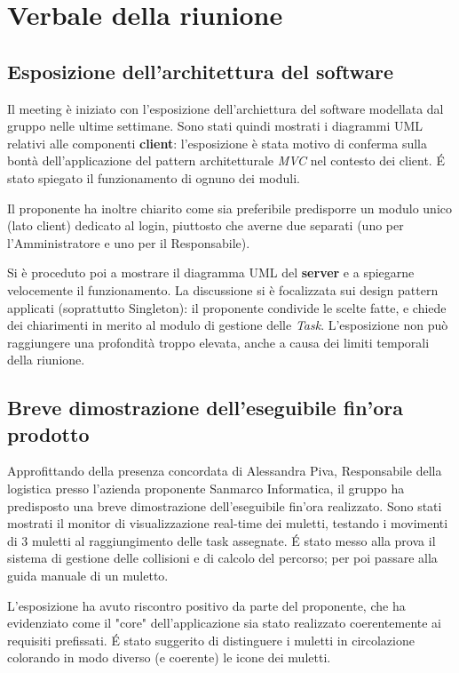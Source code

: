 \section{Verbale della riunione}

\subsection{Esposizione dell'architettura del software}

Il meeting è iniziato con l'esposizione dell'archiettura del software modellata dal gruppo nelle ultime settimane. Sono stati quindi mostrati i diagrammi UML relativi alle componenti \textbf{client}: l'esposizione è stata motivo di conferma sulla bontà dell'applicazione del pattern architetturale \textit{MVC} nel contesto dei client. \'E stato spiegato il funzionamento di ognuno dei moduli. 

Il proponente ha inoltre chiarito come sia preferibile predisporre un modulo unico (lato client) dedicato al login, piuttosto che averne due separati (uno per l'Amministratore e uno per il Responsabile).

Si è proceduto poi a mostrare il diagramma UML del \textbf{server} e a spiegarne velocemente il funzionamento. La discussione si è focalizzata sui design pattern applicati (soprattutto Singleton): il proponente condivide le scelte fatte, e chiede dei chiarimenti in merito al modulo di gestione delle \textit{Task}. L'esposizione non può raggiungere una profondità troppo elevata, anche a causa dei limiti temporali della riunione.

\subsection{Breve dimostrazione dell'eseguibile fin'ora prodotto}

Approfittando della presenza concordata di Alessandra Piva, Responsabile della logistica presso l'azienda proponente Sanmarco Informatica, il gruppo ha predisposto una breve dimostrazione dell'eseguibile fin'ora realizzato. Sono stati mostrati il monitor di visualizzazione real-time dei muletti, testando i movimenti di 3 muletti al raggiungimento delle task assegnate. \'E stato messo alla prova il sistema di gestione delle collisioni e di calcolo del percorso; per poi passare alla guida manuale di un muletto. 

L'esposizione ha avuto riscontro positivo da parte del proponente, che ha evidenziato come il "core" dell'applicazione sia stato realizzato coerentemente ai requisiti prefissati. \'E stato suggerito di distinguere i muletti in circolazione colorando in modo diverso (e coerente) le icone dei muletti. 

